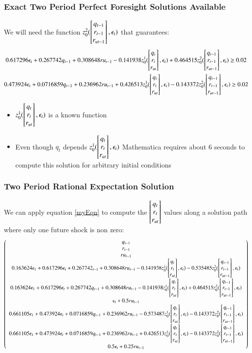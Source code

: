 \documentclass{beamer}
\begin{document}
    \begin{frame}
\frametitle{Exact Two Period Perfect Foresight Solutions  Available}

We will need the function {\small $z_0^2(\begin{bmatrix} q_{t-1}\\r_{t-1}\\r_{ut-1} \end{bmatrix},\epsilon_t)$ }that guarantees:
{\tiny 
\begin{gather*}
    0.617296 \epsilon_t+0.267742 q_{t-1}+0.308648 ru_{t-1}-0.141938
      z_0^1(\begin{bmatrix} q_t\\r_{t}\\r_{ut} \end{bmatrix},\epsilon_t)+0.464515 z_0^2(\begin{bmatrix} q_{t-1}\\r_{t-1}\\r_{ut-1} \end{bmatrix},\epsilon_t) \ge 0.02\\  
    0.473924 \epsilon_t+0.0716859 q_{t-1}+0.236962 ru_{t-1}+0.426513
      z_0^1(\begin{bmatrix} q_t\\r_{t}\\r_{ut} \end{bmatrix},\epsilon_t)-0.143372 z_0^2(\begin{bmatrix} q_{t-1}\\r_{t-1}\\r_{ut-1} \end{bmatrix},\epsilon_t)  \ge 0.02 \\
\end{gather*}
}
\begin{itemize}
\item {\small $z_0^1(\begin{bmatrix} q_t\\r_{t}\\r_{ut} \end{bmatrix},\epsilon_t)$ } is a known function
\item Even though $q_t$ depends {\small $z_0^1(\begin{bmatrix} q_t\\r_{t}\\r_{ut} \end{bmatrix},\epsilon_t)$ } Mathematica requires about 6 seconds to compute this solution for arbitrary initial conditions
\end{itemize}
    \end{frame}

    \begin{frame}
      \frametitle{Two Period Rational Expectation Solution}
We can apply equation \ref{myEqn} to compute the $\begin{bmatrix} q_t\\r_{t}\\r_{ut} \end{bmatrix}$ values along a solution path where only one future shock is non zero:
{\tiny
      \begin{gather*}
           \left(
   \begin{array}{c}
    q_{t-1} \\
    r_{t-1} \\
    ru_{t-1} \\
  0.163624 \epsilon_{1}+0.617296 \epsilon_t+0.267742 _{t-1}+0.308648 ru_{t-1}-0.141938
       z_0^1(\begin{bmatrix} q_t\\r_{t}\\r_{ut} \end{bmatrix},\epsilon_t)-0.535485 z_0^2(\begin{bmatrix} q_{t-1}\\r_{t-1}\\r_{ut-1} \end{bmatrix},\epsilon_t) \\
    0.163624 \epsilon_{1}+0.617296 \epsilon_t+0.267742 q_{t-1}+0.308648 ru_{t-1}-0.141938
      z_0^1(\begin{bmatrix} q_t\\r_{t}\\r_{ut} \end{bmatrix},\epsilon_t)+0.464515 z_0^2(\begin{bmatrix} q_{t-1}\\r_{t-1}\\r_{ut-1} \end{bmatrix},\epsilon_t) \\
    \epsilon_t+0.5 ru_{t-1} \\
    0.661105 \epsilon_{1}+0.473924 \epsilon_t+0.0716859 q_{t-1}+0.236962 ru_{t-1}-0.573487
      z_0^1(\begin{bmatrix} q_t\\r_{t}\\r_{ut} \end{bmatrix},\epsilon_t)-0.143372 z_0^2(\begin{bmatrix} q_{t-1}\\r_{t-1}\\r_{ut-1} \end{bmatrix},\epsilon_t) \\
   0.661105 \epsilon_{1}+ 0.473924 \epsilon_t+0.0716859 q_{t-1}+0.236962 ru_{t-1}+0.426513
      z_0^1(\begin{bmatrix} q_t\\r_{t}\\r_{ut} \end{bmatrix},\epsilon_t)-0.143372 z_0^2(\begin{bmatrix} q_{t-1}\\r_{t-1}\\r_{ut-1} \end{bmatrix},\epsilon_t) \\
    0.5 \epsilon_t+0.25 ru_{t-1} 
   \end{array}
   \right)
      \end{gather*}
}

    \end{frame}
\end{document}
